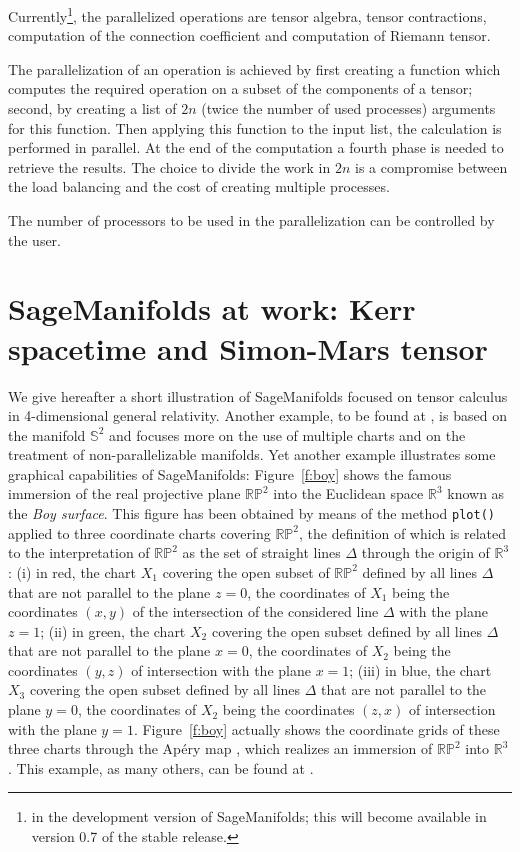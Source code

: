 \documentclass[a4paper]{jpconf}
\newcommand{\soft}[1]{\textsf{#1}}
\newcommand{\code}[1]{\texttt{#1}}
\newcommand{\SM}{\soft{SageManifolds}}
\begin{document}
Currently\footnote{in the development version of \SM{}; this
will become available in version 0.7 of the stable release.},
the parallelized operations are tensor algebra, tensor
contractions, computation of the connection coefficient
and computation of Riemann tensor.

The parallelization of an operation is achieved by first creating a
function which computes the required operation on a subset of the
components of a tensor; second, by creating a list of $2n$ (twice the
number of used processes) arguments for this function. Then applying this function
to the input list, the calculation is performed in parallel. 
At the end of the computation a fourth phase is needed to retrieve the
results.
The choice to divide the work in $2n$ is a compromise between the 
load balancing and the cost of creating multiple processes.

The number of processors to be used in the parallelization can be controlled by the
user. 




\section{SageManifolds at work: Kerr spacetime and Simon-Mars tensor}

We give hereafter a short illustration of \SM{} focused on tensor 
calculus in 4-dimensional general relativity.
Another example, to be found at \cite{SM_examples}, is
based on the manifold $\mathbb{S}^2$ and 
focuses more on the use of multiple charts and on the treatment of non-parallelizable 
manifolds. Yet another example illustrates some graphical capabilities of
\SM{}: Figure~\ref{f:boy} shows the famous
immersion of the real projective plane $\mathbb{RP}^2$ into
the Euclidean space $\mathbb{R}^3$ known as the \emph{Boy surface}.
This figure has been obtained by means of the method \code{plot()} applied
to three coordinate charts covering $\mathbb{RP}^2$,
the definition of which is related to the interpretation of
$\mathbb{RP}^2$ as the set of straight lines $\Delta$
through the origin of $\mathbb{R}^3$:
(i) in red, the chart $X_1$ covering the open subset of $\mathbb{RP}^2$ defined
by all lines $\Delta$ that are not parallel to the plane $z=0$,
the coordinates of $X_1$ being the coordinates $(x,y)$ of the intersection of
the considered line $\Delta$ with the plane $z=1$;
(ii) in green, the chart $X_2$ covering the open subset defined
by all lines $\Delta$ that are not parallel to the plane $x=0$,
the coordinates of $X_2$ being the coordinates $(y,z)$ of intersection  with the plane $x=1$;
(iii) in blue, the chart $X_3$ covering the open subset defined
by all lines $\Delta$ that are not parallel to the plane $y=0$,
the coordinates of $X_2$ being the coordinates $(z,x)$ of intersection with the plane $y=1$.
Figure~\ref{f:boy} actually shows the coordinate grids of these three
charts through the Ap\'ery map \cite{Apery86}, which realizes an immersion
of $\mathbb{RP}^2$ into $\mathbb{R}^3$. This example, as many others,
can be found at \cite{SM_examples}.
\end{document}
